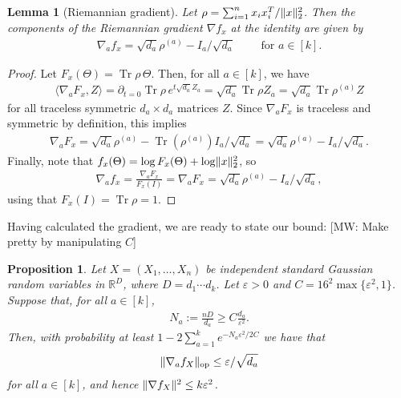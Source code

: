 \documentclass[aos]{imsart}
\newtheorem{prop}[theorem]{Proposition}
\newtheorem{lemma}[theorem]{Lemma}
\theoremstyle{definition}
\DeclareMathOperator{\op}{op}
\DeclareMathOperator{\tr}{Tr}
\DeclarePairedDelimiter{\norm}{\lVert}{\rVert}
\newcommand{\R}{{\mathbb{R}}}
\newcommand{\eps}{\varepsilon}
\newcommand{\samp}{x}
\newcommand{\rv}{X}
\newcommand{\MW}[1]{{\color{red}[MW: #1]}}
\begin{document}

\begin{lemma}[Riemannian gradient]\label{lem:gradient}
Let $\rho = \sum_{i=1}^n \samp_i \samp_i^T / \norm{\samp}_2^2$.
Then the components of the Riemannian gradient $\nabla f_{\samp}$ at the identity are given by
\begin{align*}
  \nabla_a f_{\samp} = \sqrt{d_a} \rho^{(a)} - I_a/\sqrt{d_a} \qquad \text{ for } a \in [k].
\end{align*}
\end{lemma}
\begin{proof}
  Let $F_{\samp}(\Theta) = \tr \rho \, \Theta$.
  Then, for all $a\in[k]$, we have
  \begin{align*}
   \langle \nabla_a F_{\samp} , Z \rangle
  = \partial_{t=0} \tr \rho \, e^{t \sqrt{d_a} Z_a}
  = \sqrt{d_a} \tr \rho Z_a
  = \sqrt{d_a} \tr \rho^{(a)} Z
  \end{align*}
  for all traceless symmetric $d_a \times d_a$ matrices $Z$.
  Since $\nabla_a F_{\samp}$ is traceless and symmetric by definition, this implies
  \begin{align*}
    \nabla_a F_{\samp}
  = \sqrt{d_a} \rho^{(a)} - \tr(\rho^{(a)}) I_a /\sqrt{d_a}
  = \sqrt{d_a} \rho^{(a)} - I_a/\sqrt{d_a}.
  \end{align*}
  Finally, note that $f_{\samp}(\Theta) = \log F_{\samp}(\Theta) + \log \norm{\samp}_2^2$, so
  \begin{align*}
    \nabla_a f_{\samp}
  = \frac{\nabla_a F_{\samp}}{F_{\samp}(I)}
  = \nabla_a F_{\samp}
  = \sqrt{d_a} \rho^{(a)} - I_a/\sqrt{d_a},
  \end{align*}
  using that $F_{\samp}(I) = \tr \rho = 1$.
\end{proof}

Having calculated the gradient, we are ready to state our bound:
\MW{Make pretty by manipulating $C$}
\begin{prop}\label{prop:gradient-bound}
Let $\rv = (\rv_1,\dots,\rv_n)$ be independent standard Gaussian random variables in $\R^D$, where $D=d_1\cdots{}d_k$.
Let $\eps>0$ and $C = 16^2\max\{\eps^2,1\}$.
Suppose that, for all $a \in [k]$,
\begin{align*}
  N_a := \frac{n D}{d_a} \geq C \frac{d_a}{\eps^2}.
\end{align*}
Then, with probability at least $1 - 2 \sum_{a=1}^k e^{-N_a \eps^2/2C}$ we have that
\begin{align*}
  \norm{\nabla_a f_{\rv}}_{\op} \leq \eps/\sqrt{d_a}
\end{align*}
for all $a\in[k]$, and hence $\norm{\nabla f_{\rv}}^2 \leq k \eps^2$.
\end{prop}
\end{document}
